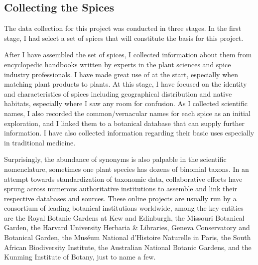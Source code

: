 \subsection{Collecting the Spices}

The data collection for this project was conducted in three stages. In the first stage, I had select a set of spices that will constitute the basis for this project.

After I have assembled the set of spices, I collected information about them from encyclopedic handbooks written by experts in the plant sciences and spice industry professionals. I have made great use of \textcites{van_wyk_culinary_2014}{peter_handbook_2012}{hu_food_2005} at the start, especially when matching plant products to plants. At this stage, I have focused on the identity and characteristics of spices including geographical distribution and native habitats, especially where I saw any room for confusion. As I collected scientific names, I also recorded the common/vernacular names for 
each spice as an initial exploration, and I linked them to a botanical database that can supply further information. I have also collected information regarding their basic uses especially in traditional medicine.

Surprisingly, the abundance of synonyms is also palpable in the scientific nomenclature, sometimes one plant species has dozens of binomial \glspl{taxon}. In an attempt towards standardization of taxonomic data, collaborative efforts have sprung across numerous authoritative institutions to assemble and link their respective databases and sources. These online projects are usually run by a consortium of leading botanical institutions worldwide, among the key entities are the Royal Botanic Gardens at Kew and Edinburgh, the Missouri Botanical Garden, the Harvard University Herbaria \& Libraries, Geneva Conservatory and Botanical Garden, the Muséum National d'Histoire Naturelle in Paris, the South African Biodiversity Institute, the Australian National Botanic Gardens, and the Kunming Institute of Botany, just to name a few.

